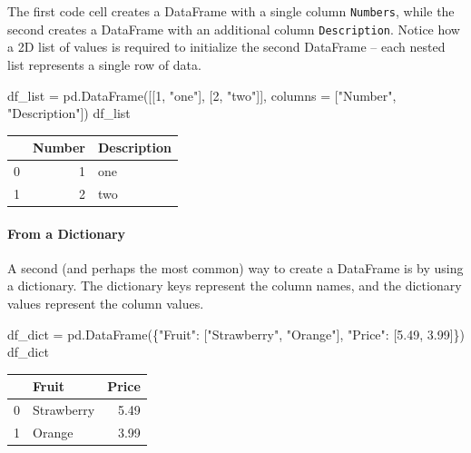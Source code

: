 \documentclass[
  letterpaper,
  DIV=11,
  numbers=noendperiod]{scrreprt}
\let\oldparagraph\paragraph
\renewcommand{\paragraph}[1]{\oldparagraph{#1}\mbox{}}
\newenvironment{Shaded}{\begin{snugshade}}{\end{snugshade}}
\newcommand{\DecValTok}[1]{\textcolor[rgb]{0.68,0.00,0.00}{#1}}
\newcommand{\FloatTok}[1]{\textcolor[rgb]{0.68,0.00,0.00}{#1}}
\newcommand{\NormalTok}[1]{\textcolor[rgb]{0.00,0.23,0.31}{#1}}
\newcommand{\OperatorTok}[1]{\textcolor[rgb]{0.37,0.37,0.37}{#1}}
\newcommand{\StringTok}[1]{\textcolor[rgb]{0.13,0.47,0.30}{#1}}
\begin{document}
The first code cell creates a DataFrame with a single column
\texttt{Numbers}, while the second creates a DataFrame with an
additional column \texttt{Description}. Notice how a 2D list of values
is required to initialize the second DataFrame -- each nested list
represents a single row of data.

\begin{Shaded}
\begin{Highlighting}[]
\NormalTok{df\_list }\OperatorTok{=}\NormalTok{ pd.DataFrame([[}\DecValTok{1}\NormalTok{, }\StringTok{"one"}\NormalTok{], [}\DecValTok{2}\NormalTok{, }\StringTok{"two"}\NormalTok{]], columns }\OperatorTok{=}\NormalTok{ [}\StringTok{"Number"}\NormalTok{, }\StringTok{"Description"}\NormalTok{])}
\NormalTok{df\_list}
\end{Highlighting}
\end{Shaded}

\begin{tabular}{lrl}
\toprule
{} &  Number & Description \\
\midrule
0 &       1 &         one \\
1 &       2 &         two \\
\bottomrule
\end{tabular}

\hypertarget{from-a-dictionary}{%
\paragraph{From a Dictionary}\label{from-a-dictionary}}

A second (and perhaps the most common) way to create a DataFrame is by
using a dictionary. The dictionary keys represent the column names, and
the dictionary values represent the column values.

\begin{Shaded}
\begin{Highlighting}[]
\NormalTok{df\_dict }\OperatorTok{=}\NormalTok{ pd.DataFrame(\{}\StringTok{"Fruit"}\NormalTok{: [}\StringTok{"Strawberry"}\NormalTok{, }\StringTok{"Orange"}\NormalTok{], }\StringTok{"Price"}\NormalTok{: [}\FloatTok{5.49}\NormalTok{, }\FloatTok{3.99}\NormalTok{]\})}
\NormalTok{df\_dict}
\end{Highlighting}
\end{Shaded}

\begin{tabular}{llr}
\toprule
{} &       Fruit &  Price \\
\midrule
0 &  Strawberry &   5.49 \\
1 &      Orange &   3.99 \\
\bottomrule
\end{tabular}
\end{document}
